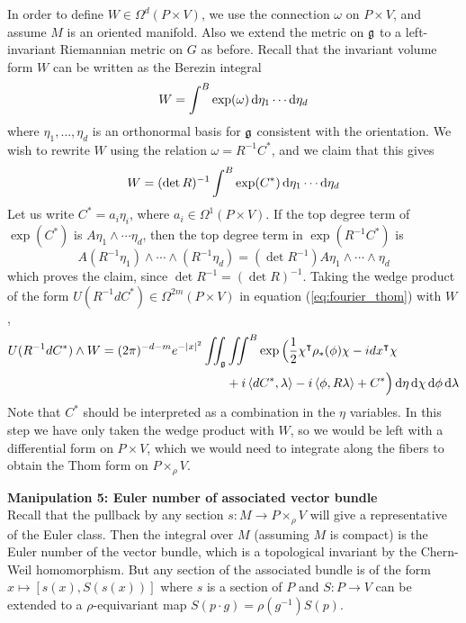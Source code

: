 In order to define $W\in \Omega^d(P\times V)$, we use the connection $\omega$ 
on $P\times V$, and assume $M$ is an oriented manifold. Also we
extend the metric on  $\operatorname{\mathfrak{g}}$ to a left-invariant Riemannian metric on $G$ as before.
Recall that the invariant volume form $W$ can be written as the Berezin integral
\[
W = \int^B \exp(\omega) \odif{\eta_1}\cdots \odif{\eta_d}
\] 
where $\eta_1,\ldots,\eta_d$ is an orthonormal basis for $\operatorname{\mathfrak{g}}$ consistent with
the orientation. We wish to rewrite $W$ using the relation $\omega = R^{-1}C^*$,
and we claim that this gives 
\[
W = (\det R)^{-1}\int^B \exp(C^*) \odif{\eta_1}\cdots \odif{\eta_d}
\] 
Let us write $C^* = a_i\eta_i$, where  $a_i \in \Omega^1(P\times V)$. 
If the top degree term of $\exp(C^*)$ is  $A \eta_1\wedge\cdots\eta_d$, then
the top degree term in $\exp(R^{-1}C^*)$ is 
\[
A (R^{-1}\eta_1)\wedge\cdots\wedge(R^{-1}\eta_d)
=(\det R^{-1}) A \eta_1\wedge\cdots\wedge\eta_d
\] 
which proves the claim, since $\det R^{-1} = (\det R)^{-1}$.
Taking the wedge product of the form 
$U(R^{-1}dC^*) \in \Omega^{2m}(P\times V)$ in equation 
(\ref{eq:fourier_thom}) with $W$,
\begin{align} \label{eq:AJ_formula_thom}
U(R^{-1}dC^*)\wedge W	
= (2\pi)^{-d-m}e^{-\abs{x}^2}\iint_{\g}&\iint^B 
	\exp\Big(\frac{1}{2}\chi^{\intercal}\rho_*(\phi)\chi - idx^\intercal \chi\\
	&+i\gen{dC^*,\lambda}-i\gen{\phi,R\lambda} + C^*\Big)  \odif{\eta}
	\odif{\chi} \odif{\phi}\odif{\lambda}  \nonumber 
\end{align}
Note that $C^*$ should be interpreted as a combination in the $\eta$ variables. 
In this step we have only taken the wedge product with $W$, so we would be left 
with a differential form on  $P\times V$, which we would need to integrate along 
the fibers to obtain the Thom form on $P\times_\rho V$. 

\vspace{1ex}\noindent
\textbf{Manipulation 5: Euler number of associated vector bundle} \\
Recall that the pullback by any section $s:M\to P\times_\rho V$ will give a
representative of the Euler class. 
Then the integral over $M$ (assuming $M$ is compact) is the Euler number of the 
vector bundle, which is a topological invariant by the Chern-Weil homomorphism. 
But any section of the associated bundle is of the form $x\mapsto
[s(x),S(s(x))]$ where $s$ is a section of  $P$ and  $S:P \to V$ can be extended
to a $\rho$-equivariant map $S(p\cdot g)=\rho(g^{-1})S(p)$. 

